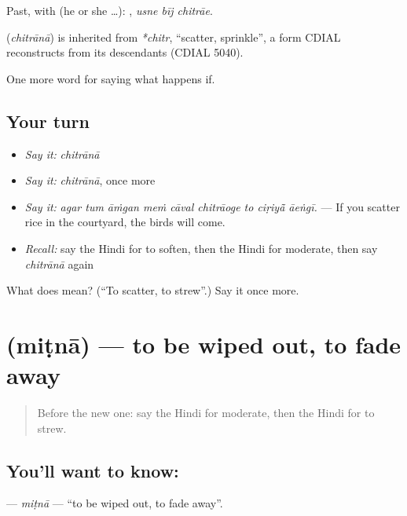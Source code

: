 Past, with  (he or she …):   , \emph{usne bīj chitrāe}.

\begin{cousinweb}
\textbf{} (\emph{chitrānā}) is inherited from \emph{*chitr}, \textquotedblleft{}scatter, sprinkle\textquotedblright{}, a form CDIAL reconstructs from its descendants (CDIAL 5040).
\end{cousinweb}

\begin{grammarlens}[title={What you've built}]
One more word for saying what happens if.
\end{grammarlens}

\subsection*{Your turn}
\begin{itemize}
\raggedright
  \item \emph{Say it:} \emph{chitrānā}
  \item \emph{Say it:} \emph{chitrānā}, once more
  \item \emph{Say it:} \emph{agar tum āṁgan meṁ cāval chitrāoge to ciṛiyā̃ āeṅgī.} — If you scatter rice in the courtyard, the birds will come.
  \item \emph{Recall:} say the Hindi for to soften, then the Hindi for moderate, then say \emph{chitrānā} again
\end{itemize}

\begin{tcolorbox}[breakable,colback=teal!4,colframe=teal!35!black,title={Before you move on}]
What does  mean? (\textquotedblleft{}To scatter, to strew\textquotedblright{}.) Say it once more.
\end{tcolorbox}
\section[\texorpdfstring{\hi{मिटना} (miṭnā)}{मिटना (miṭnā)}]{ (miṭnā) — to be wiped out, to fade away}

\label{lesson:HI-C385-mitna}



\begin{quote}
Before the new one: say the Hindi for moderate, then the Hindi for to strew.
\end{quote}

\subsection*{You'll want to know: }
\textbf{} — \emph{miṭnā} — \textquotedblleft{}to be wiped out, to fade away\textquotedblright{}.

